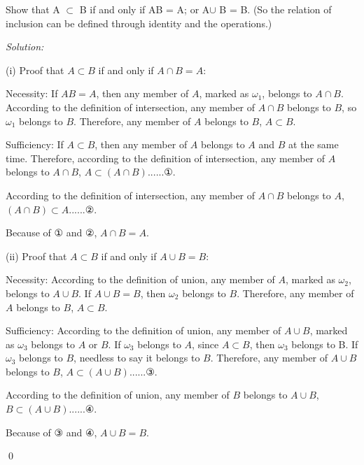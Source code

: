 \documentclass[12pt]{article}
\newenvironment{problem}[2][Problem]{\begin{trivlist}
\item[\hskip \labelsep {\bfseries #1}\hskip \labelsep {\bfseries #2.}]}{\end{trivlist}}
\newenvironment{sol}
    {\emph{Solution:}
    }
    {
    \qed
    }
\begin{document}
\begin{problem}{3}
 Show that A $\subset$ B if and only if AB = A; or A$\cup$ B = B. (So the relation
of inclusion can be defined through identity and the operations.)
\end{problem}
\begin{sol}

(i) Proof that $A\subset B$ if and only if $A\cap B=A$:

Necessity: If $AB=A$, then any member of $A$, marked as $\omega_1$, belongs to $A\cap B$. According to the definition of intersection, any member of $A\cap B$ belongs to $B$, so $\omega_1$ belongs to $B$. Therefore, any member of $A$ belongs to $B$, $A\subset B$.

Sufficiency: If $A\subset B$, then any member of $A$ belongs to $A$ and $B$ at the same time. Therefore, according to the definition of intersection, any member of $A$ belongs to $A\cap B$, $A\subset (A\cap B)$......①.

According to the definition of intersection, any member of $A\cap B$ belongs to $A$, $(A\cap B)\subset A$......②.

Because of ① and ②, $A\cap B=A$.

(ii) Proof that $A\subset B$ if and only if $A\cup B=B$:

Necessity: According to the definition of union, any member of $A$, marked as $\omega_2$, belongs to $A\cup B$. If $A\cup B=B$, then $\omega_2$ belongs to $B$. Therefore, any member of $A$ belongs to $B$, $A\subset B$.

Sufficiency: According to the definition of union, any member of $A\cup B$, marked as $\omega_3$ belongs to $A$ or $B$. If $\omega_3$ belongs to $A$, since $A\subset B$, then $\omega_3$ belongs to B. If $\omega_3$ belongs to $B$, needless to say it belongs to $B$. Therefore, any member of $A\cup B$ belongs to $B$, $A\subset(A\cup B)$......③.

According to the definition of union, any member of $B$ belongs to $A\cup B$, $B\subset(A\cup B)$......④.

Because of ③ and ④, $A\cup B=B$.
\end{sol}
\end{document}
